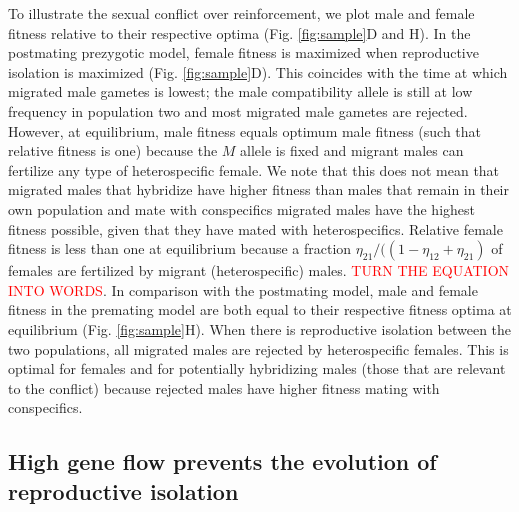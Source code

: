 \documentclass[11pt]{article}
\begin{document}
To illustrate the sexual conflict over reinforcement, we plot male and female fitness relative to their respective optima (Fig. \ref{fig:sample}D and H). 
In the postmating prezygotic model, female fitness is maximized when reproductive isolation is maximized (Fig. \ref{fig:sample}D). 
This coincides with the time at which migrated male gametes is lowest; the male compatibility allele is still at low frequency in population two and most migrated male gametes are rejected.  
However, at equilibrium, male fitness equals optimum male fitness (such that relative fitness is one) because the $M$ allele is fixed and migrant males can fertilize any type of heterospecific female. 
We note that this does not mean that migrated males that hybridize have higher fitness than males that remain in their own population and mate with conspecifics migrated males have the highest fitness possible, given that they have mated with heterospecifics. 
Relative female fitness is less than one at equilibrium because a fraction $\eta_{21}/((1-\eta_{12} + \eta_{21})$ of females are fertilized by migrant (heterospecific) males. \textcolor{red}{TURN THE EQUATION INTO WORDS}.
In comparison with the postmating model, male and female fitness in the premating model are both equal to their respective fitness optima at equilibrium (Fig. \ref{fig:sample}H).  
When there is reproductive isolation between the two populations, all migrated males are rejected by heterospecific females.  
This is optimal for females and for potentially hybridizing males (those that are relevant to the conflict) because rejected males have higher fitness mating with conspecifics.

\subsection*{High gene flow prevents the evolution of reproductive isolation}\label{section:migration}
\end{document}
